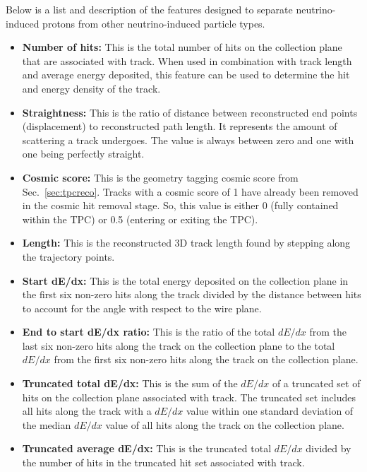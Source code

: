     Below is a list and description of the features designed to separate
    neutrino-induced protons from other neutrino-induced particle types.
    \begin{itemize}
      \item \textbf{Number of hits:} This is the total number of hits on the
      collection plane that are associated with track. When used in combination
      with track length and average energy deposited, this feature can be used
      to determine the hit and energy density of the track.
      \item \textbf{Straightness:} This is the ratio of distance between
      reconstructed end points (displacement) to reconstructed path length. It
      represents the amount of scattering a track undergoes. The value is
      always between zero and one with one being perfectly straight.
      \item \textbf{Cosmic score:} This is the geometry tagging cosmic score
      from Sec.~\ref{sec:tpcreco}. Tracks with a cosmic score of 1 have already
      been removed in the cosmic hit removal stage. So, this value is either 0
      (fully contained within the TPC) or 0.5 (entering or exiting the TPC).
      \item \textbf{Length:} This is the reconstructed 3D track length found by
      stepping along the trajectory points.
      \item \textbf{Start dE/dx:} This is the total energy deposited on the
      collection plane in the first six non-zero hits along the track divided
      by the distance between hits to account for the angle with respect to the
      wire plane.
      \item \textbf{End to start dE/dx ratio:} This is the ratio of the total
      $dE/dx$ from the last six non-zero hits along the track on the collection
      plane to the total $dE/dx$ from the first six non-zero hits along the
      track on the collection plane.
      \item \textbf{Truncated total dE/dx:} This is the sum of the $dE/dx$ of a
      truncated set of hits on the collection plane associated with track. The
      truncated set includes all hits along the track with a $dE/dx$ value
      within one standard deviation of the median $dE/dx$ value of all hits
      along the track on the collection plane.
      \item \textbf{Truncated average dE/dx:} This is the truncated total
      $dE/dx$ divided by the number of hits in the truncated hit set associated
      with track.
    \end{itemize}

